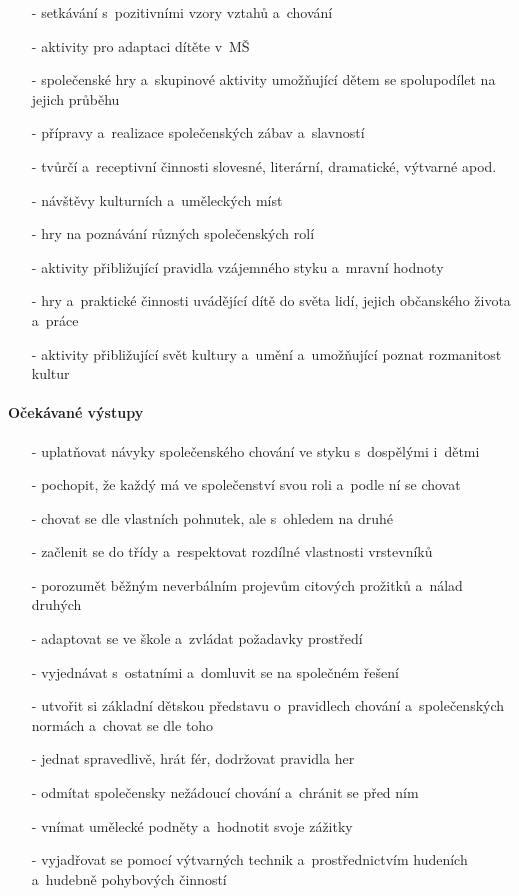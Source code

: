					\begin{itemize}
					\setlength\itemsep{-2mm}
						\item[-]setkávání s~pozitivními vzory vztahů a~chování
						\item[-]aktivity pro adaptaci dítěte v~MŠ
						\item[-]společenské hry a~skupinové aktivity umožňující dětem se spolupodílet na jejich průběhu
						\item[-]přípravy a~realizace společenských zábav a~slavností
						\item[-]tvůrčí a~receptivní činnosti slovesné, literární, dramatické, výtvarné apod.
						\item[-]návštěvy kulturních a~uměleckých míst
						\item[-]hry na poznávání různých společenských rolí
						\item[-]aktivity přibližující pravidla vzájemného styku a~mravní hodnoty
						\item[-]hry a~praktické činnosti uvádějící dítě do světa lidí, jejich občanského života a~práce
						\item[-]aktivity přibližující svět kultury a~umění a~umožňující poznat rozmanitost kultur
					\end{itemize}
					
					\paragraph{Očekávané výstupy}

					\begin{itemize}
					\setlength\itemsep{-2mm}
						\item[-]uplatňovat návyky společenského chování ve styku s~dospělými i~dětmi
						\item[-]pochopit, že každý má ve společenství svou roli a~podle ní se chovat
						\item[-]chovat se dle vlastních pohnutek, ale s~ohledem na druhé
						\item[-]začlenit se do třídy a~respektovat rozdílné vlastnosti vrstevníků
						\item[-]porozumět běžným neverbálním projevům citových prožitků a~nálad druhých
						\item[-]adaptovat se ve škole a~zvládat požadavky prostředí
						\item[-]vyjednávat s~ostatními a~domluvit se na společném řešení
						\item[-]utvořit si základní dětskou představu o~pravidlech chování a~společenských normách a~chovat se dle toho
						\item[-]jednat spravedlivě, hrát fér, dodržovat pravidla her 
						\item[-]odmítat společensky nežádoucí chování a~chránit se před ním
						\item[-]vnímat umělecké podněty a~hodnotit svoje zážitky
						\item[-]vyjadřovat se pomocí výtvarných technik a~prostřednictvím hudeních a~hudebně pohybových činností
					\end{itemize}

